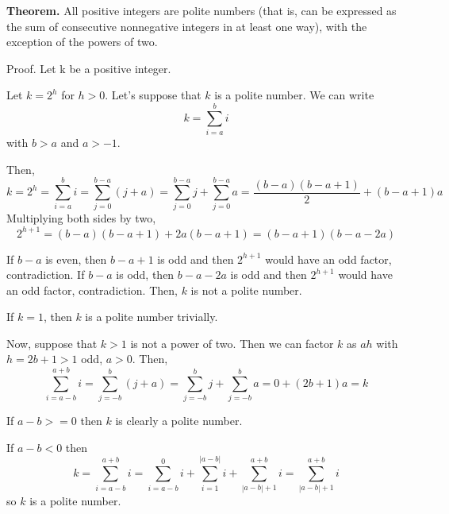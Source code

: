 \documentclass[12pt]{article}
\begin{document}
{\bf Theorem.} All positive integers are polite numbers (that is, can be expressed as the sum of consecutive nonnegative integers in at least one way), with the exception of the powers of two.

Proof. Let k be a positive integer.

Let $k = 2^h$ for $h > 0$. Let's suppose that $k$ is a polite number. We can write
$$k = \sum_{i=a}^b i$$
with $b > a$ and $a > -1$.

Then,
$$k = 2^h = \sum_{i=a}^b i = \sum_{j=0}^{b-a} (j+a) = \sum_{j=0}^{b-a} j + \sum_{j=0}^{b-a} a = \frac{(b-a)(b-a+1)}{2} + (b-a+1)a $$
Multiplying both sides by two,
$$ 2^{h+1} = (b-a)(b-a+1) + 2a(b-a+1) = (b-a+1)(b-a-2a)$$

If $b-a$ is even, then $b-a+1$ is odd and then $2^{h+1}$ would have an odd factor, contradiction.
If $b-a$ is odd, then $b-a-2a$ is odd and then $2^{h+1}$ would have an odd factor, contradiction.
Then, $k$ is not a polite number.

If $k = 1$, then $k$ is a polite number trivially.

Now, suppose that $k > 1$ is not a power of two. Then we can factor $k$ as $ah$ with $h = 2b+1 > 1$ odd, $a > 0$. Then,
$$\sum_{i=a-b}^{a+b} i = \sum_{j=-b}^{b} (j + a) = \sum_{j=-b}^b j + \sum_{j=-b}^{b} a = 0 + (2b+1)a = k$$

If $a-b >= 0$ then $k$ is clearly a polite number.

If $a-b < 0$ then
$$k = \sum_{i=a-b}^{a+b} i = \sum_{i=a-b}^{0} i + \sum_{i=1}^{|a-b|} i + \sum_{|a-b|+1}^{a+b} i = \sum_{|a-b|+1}^{a+b} i$$
so $k$ is a polite number.
\end{document}
